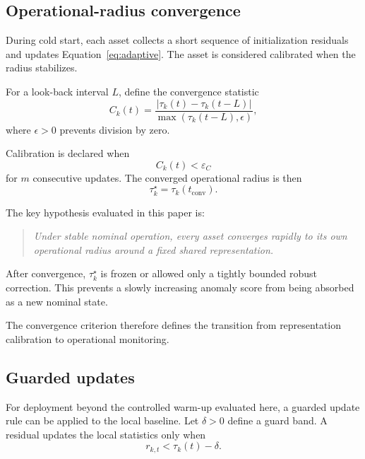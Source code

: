 \documentclass[11pt,a4paper]{article}
\begin{document}
\subsection{Operational-radius convergence}

During cold start, each asset collects a short sequence of initialization residuals and updates
Equation~\ref{eq:adaptive}. The asset is considered calibrated when the radius stabilizes.

For a look-back interval $L$, define the convergence statistic
\begin{equation}
C_k(t)=
\frac{\left|\tau_k(t)-\tau_k(t-L)\right|}
{\max\left(\tau_k(t-L),\epsilon\right)},
\label{eq:convergence}
\end{equation}
where $\epsilon>0$ prevents division by zero.

Calibration is declared when
\begin{equation}
C_k(t)<\varepsilon_C
\end{equation}
for $m$ consecutive updates. The converged operational radius is then
\begin{equation}
\tau_k^\star=\tau_k(t_{\mathrm{conv}}).
\label{eq:taustar}
\end{equation}

The key hypothesis evaluated in this paper is:

\begin{quote}
\emph{Under stable nominal operation, every asset converges rapidly to its own operational
radius around a fixed shared representation.}
\end{quote}

After convergence, $\tau_k^\star$ is frozen or allowed only a tightly bounded robust correction.
This prevents a slowly increasing anomaly score from being absorbed as a new nominal state.

The convergence criterion therefore defines the transition from representation
calibration to operational monitoring.

\subsection{Guarded updates}

For deployment beyond the controlled warm-up evaluated here, a guarded update rule can be applied to the local baseline. Let $\delta>0$ define a
guard band. A residual updates the local statistics only when
\begin{equation}
r_{k,t}<\tau_k(t)-\delta.
\label{eq:safe-update}
\end{equation}
\end{document}
